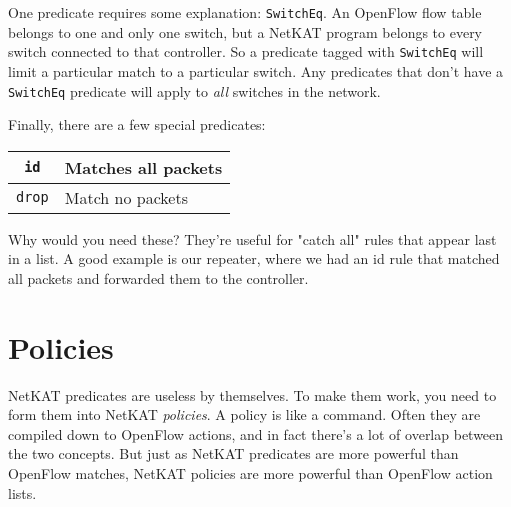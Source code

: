 One predicate requires some explanation: \lstinline{SwitchEq}.  
An OpenFlow flow table belongs to one and only one switch, but a NetKAT program belongs to every
switch connected to that controller.  
So a predicate tagged with \lstinline{SwitchEq} will limit a particular match to a particular switch.
Any predicates that don't have a \lstinline{SwitchEq} predicate will apply to \textit{all} switches in the network.

Finally, there are a few special predicates:

\bigskip
\begin{tabularx}{6in}{|c|X|}
\hline\hline
\texttt{id} & Matches all packets
\\ \hline  
\texttt{drop} & Match no packets
\\ \hline\hline
\end{tabularx}
\bigskip

Why would you need these?  
They're useful for "catch all" rules that appear last in a list.
A good example is our repeater, where we had an id rule that matched all packets and
forwarded them to the controller.

\section{Policies}

NetKAT predicates are useless by themselves.  
To make them work, you need to form them into NetKAT \textit{policies}.
A policy is like a command.  
Often they are compiled down to OpenFlow actions, and in fact there's a lot of overlap between the two
concepts.
But just as NetKAT predicates are more powerful than OpenFlow matches, NetKAT policies are more
powerful than OpenFlow action lists.

